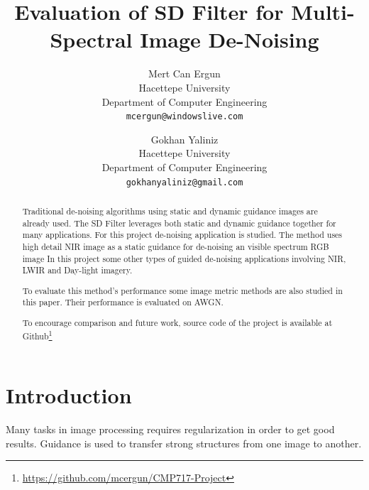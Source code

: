 \documentclass[10pt,twocolumn,letterpaper]{article}
\begin{document}
	
	\title{Evaluation of SD Filter for Multi-Spectral Image De-Noising}
	
	\author{Mert Can Ergun\\
		Hacettepe University\\
		Department of Computer Engineering\\
		{\tt\small mcergun@windowslive.com}
		\and
		Gokhan Yaliniz\\
		Hacettepe University\\
		Department of Computer Engineering\\
		{\tt\small gokhanyaliniz@gmail.com}
	}
	
	\maketitle
	
	\begin{abstract}
		Traditional de-noising algorithms using static and dynamic guidance images are already used. The SD Filter leverages both static and dynamic guidance together for many applications. For this project de-noising application is studied. The method uses high detail NIR image as a static guidance for de-noising an visible spectrum RGB image\cite{ham2015robust} In this project some other types of guided de-noising applications involving NIR, LWIR and Day-light imagery.
		
		To evaluate this method's performance some image metric methods are also studied in this paper. Their performance is evaluated on AWGN.
		
		 To encourage comparison and future work, source code of the project is available at Github\footnote{\href{https://github.com/mcergun/CMP717-Project}{https://github.com/mcergun/CMP717-Project}}
	\end{abstract}
	
	\section{Introduction}
	
	Many tasks in image processing requires regularization in order to get good results. Guidance is used to transfer strong structures from one image to another. 
	
\end{document}

